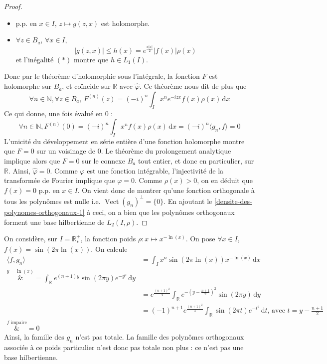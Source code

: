 \begin{proof}
\begin{itemize}
			\item p.p. en $x \in I$, $z \mapsto g(z, x)$ est holomorphe.
			\item $\forall z \in B_a$, $\forall x \in I$,
			\[ \vert g(z, x) \vert \leq h(x) = e^{\frac{a \vert x \vert}{2}} \vert f(x) \vert \rho(x) \]
			et l'inégalité $(*)$ montre que $h \in L_1(I)$.
		\end{itemize}
		Donc par le théorème d'holomorphie sous l'intégrale, la fonction $F$ est holomorphe sur $B_a$, et coïncide sur $\mathbb{R}$ avec $\hat{\varphi}$.
		Ce théorème nous dit de plus que
		\[ \forall n \in \mathbb{N}, \forall z \in B_a, \, F^{(n)}(z) = (-i)^n \int_I x^n e^{-izx} f(x) \rho(x) \, \mathrm{d}x \]
		Ce qui donne, une fois évalué en $0$ :
		\[ \forall n \in \mathbb{N}, F^{(n)}(0) = (-i)^n \int_I x^n f(x) \rho(x) \, \mathrm{d}x = (-i)^n \langle g_n, f \rangle = 0 \]
		L'unicité du développement en série entière d'une fonction holomorphe montre que $F = 0$ sur un voisinage de $0$. Le théorème du prolongement analytique implique alors que $F = 0$ sur le connexe $B_a$ tout entier, et donc en particulier, sur $\mathbb{R}$. Ainsi, $\hat{\varphi} = 0$. Comme $\varphi$ est une fonction intégrable, l'injectivité de la transformée de Fourier implique que $\varphi = 0$. Comme $\rho(x) > 0$, on en déduit que $f(x) = 0$ p.p. en $x \in I$. On vient donc de montrer qu'une fonction orthogonale à tous les polynômes est nulle i.e. $\operatorname{Vect}(g_n)^\perp = \{ 0 \}$.
		En ajoutant le \cref{densite-des-polynomes-orthogonaux-1} à ceci, on a bien que les polynômes orthogonaux forment une base hilbertienne de $L_2(I, \rho)$.
	\end{proof}

	\begin{cexample}
		On considère, sur $I = \mathbb{R}^+_*$, la fonction poids $\rho : x \mapsto x^{-\ln(x)}$. On pose $\forall x \in I$, $f(x) = \sin(2 \pi \ln(x))$. On calcule
		\begin{align*}
			\langle f, g_n \rangle &= \int_I x^n \sin(2\pi \ln(x)) x^{-\ln(x)} \, \mathrm{d}x \\
			\overset{y = \ln(x)}&{=} \int_{\mathbb{R}} e^{(n+1)y} \sin(2 \pi y) e^{-y^2} \, \mathrm{d}y \\
			&= e^{\frac{(n+1)^2}{4}} \int_{\mathbb{R}} e^{- \left (y - \frac{n+1}{2} \right)^2} \sin(2 \pi y) \, \mathrm{d}y \\
			&= (-1)^{n+1} e^{\frac{(n+1)^2}{4}} \int_{\mathbb{R}} \sin(2 \pi t) e^{-t^2} \, \mathrm{d}t \text{, avec } t = y - \frac{n+1}{2} \\
			\overset{f \text{ impaire}}&{=} 0
		\end{align*}
		Ainsi, la famille des $g_n$ n'est pas totale. La famille des polynômes orthogonaux associée à ce poids particulier n'est donc pas totale non plus : ce n'est pas une base hilbertienne.
	\end{cexample}

